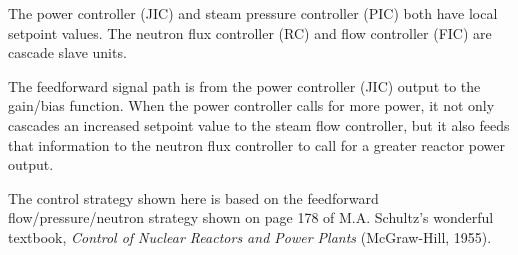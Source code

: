 The power controller (JIC) and steam pressure controller (PIC) both have local setpoint values.  The neutron flux controller (RC) and flow controller (FIC) are cascade slave units.  

\vskip 10pt

The feedforward signal path is from the power controller (JIC) output to the gain/bias function.  When the power controller calls for more power, it not only cascades an increased setpoint value to the steam flow controller, but it also feeds that information to the neutron flux controller to call for a greater reactor power output.







The control strategy shown here is based on the feedforward flow/pressure/neutron strategy shown on page 178 of M.A. Schultz's wonderful textbook, {\it Control of Nuclear Reactors and Power Plants} (McGraw-Hill, 1955).




